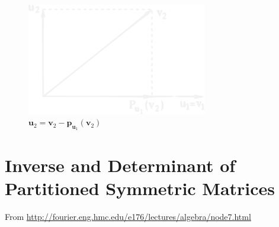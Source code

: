 \documentclass[10pt,b5paper,titlepage]{book}
\begin{document}
\begin{figure}[h]
    \centering
    \includegraphics[width=0.7\textwidth]{./img/GramSchmidt_inv}
    \caption{$\mathbf{u}_{2} = \mathbf{v}_{2} - \mathbf{p}_{\mathbf{u}_{1}}(\mathbf{v}_{2})$}
    \label{fig:GramSchmidt}
\end{figure}







\chapter{Inverse and Determinant of Partitioned Symmetric Matrices}
From \url{http://fourier.eng.hmc.edu/e176/lectures/algebra/node7.html}\\
\end{document}
